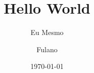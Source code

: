 \documentclass{article}
\begin{document}
\title{Hello World}
\date{\today}
\author{Eu Mesmo \and Fulano}
\maketitle

\lipsum
\end{document}

